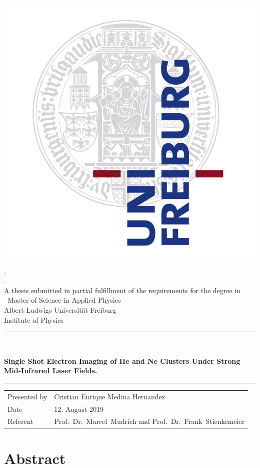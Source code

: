 \documentclass[a4paper,12pt,bibtotocnumbered, twosite]{scrreprt}
\newcommand{\titel}{Single Shot Electron Imaging of He and Ne Clusters Under Strong Mid-Infrared Laser Fields.}
\newcommand{\welchethesis}{Master of Science in Applied Physics}
\newcommand{\thesisofwas}{A thesis submitted in partial fulfillment of the
requirements for the degree in }
\newcommand{\welchesInstitute}{Institute of Physics}
\newcommand{\welcheUni}{Albert-Ludwigs-Universität Freiburg}
\newcommand{\autor}{Cristian Enrique Medina Hernandez}
\newcommand{\datee}{12. August 2019} %
\newcommand{\referent}{ Prof.\ Dr.\ Marcel\ Mudrich and Prof.\ Dr.\ Frank\ Stienkemeier  }
\begin{document}
\begin{titlepage}
\centering
\includegraphics[width=7 cm]{logo}

\begin{center}    
    {\LARGE .} \\[0.5cm]
    {\large .} \\[5mm]
    {\large  \thesisofwas\ \welchethesis} \\ \welcheUni \\ \welchesInstitute  \\[5mm]
    \rule{\textwidth}{2pt}\\[0.5cm] 
    {\begin{spacing}{1.15} \huge \bfseries \titel \\
    \end{spacing}}
    \rule{\textwidth}{2pt}    
    \vfill 
 
     



    \begin{tabular}{ll} 
      Presented by & \autor \\
      Date & \datee \\
      Referent & \referent \\
    \end{tabular}  

\end{center}
    
\end{titlepage}


\chapter*{Abstract}
\end{document}
